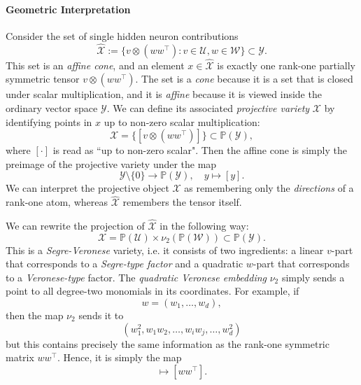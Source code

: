 \paragraph{Geometric Interpretation}

Consider the set of single hidden neuron contributions
\begin{equation}
    \widehat{\mathcal{X}} := \{v \otimes (ww^{\top}) : v\in \mathcal{U}, w\in \mathcal{W}\} \subset \mathcal{Y}.
\end{equation}
This set is an \textit{affine cone}, and an element $x \in \widehat{\mathcal{X}}$ is exactly one rank-one partially symmetric tensor $v\otimes (ww^{\top})$.
The set is a \textit{cone} because it is a set that is closed under scalar multiplication, and it is \textit{affine} because it is viewed inside the ordinary vector space $\mathcal{Y}$.
We can define its associated \textit{projective variety} $\mathcal{X}$ by identifying points in $x$ up to non-zero scalar multiplication:
\begin{equation}\label{eq: projection of X}
    \mathcal{X}=\{\left[v \otimes (ww^{\top})\right]\} \subset \mathbb{P}(\mathcal{Y}),
\end{equation}
where $[\cdot]$ is read as ``up to non-zero scalar".
Then the affine cone is simply the preimage of the projective variety under the map
\begin{equation}
    \mathcal{Y} \setminus \{0\} \to \mathbb{P}(\mathcal{Y}), \quad y \mapsto [y].
\end{equation}
We can interpret the projective object $\mathcal{X}$ as remembering only the \textit{directions} of a rank-one atom, whereas $\widehat{\mathcal{X}}$ remembers the tensor itself.

We can rewrite the projection of $\widehat{\mathcal{X}}$ in the following way:
\begin{equation}
    \mathcal{X} = \mathbb{P}(\mathcal U) \times \nu_{2}(\mathbb{P}(\mathcal W)) \subset \mathbb{P}(\mathcal Y).
\end{equation}
This is a \textit{Segre-Veronese} variety, i.e. it consists of two ingredients: a linear $v$-part that corresponds to a \textit{Segre-type factor} and a quadratic $w$-part that corresponds to a \textit{Veronese-type} factor.
The \textit{quadratic Veronese embedding} $\nu_{2}$ simply sends a point to all degree-two monomials in its coordinates.
For example, if 
\begin{equation*}
    w=(w_{1}, \dots, w_{d}),
\end{equation*}
then the map $\nu_{2}$ sends it to
\begin{equation*}
    (w_{1}^{2}, w_{1}w_{2}, \dots, w_{i}w_{j}, \dots, w_{d}^{2})
\end{equation*}
but this contains precisely the same information as the rank-one symmetric matrix $ww^{\top}$.
Hence, it is simply the map
\begin{equation*}
    [w] \mapsto [ww^{\top}].
\end{equation*}

